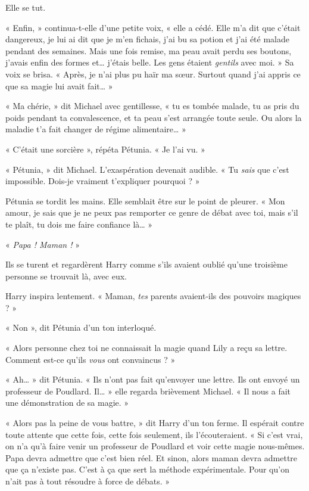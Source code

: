 Elle se tut.

« Enfin, » continua-t-elle d'une petite voix, « elle a cédé. Elle m'a dit que c'était dangereux, je lui ai dit que je m'en fichais, j'ai bu sa potion et j'ai été malade pendant des semaines. Mais une fois remise, ma peau avait perdu ses boutons, j'avais enfin des formes et… j'étais belle. Les gens étaient \emph{gentils}  avec moi. » Sa voix se brisa. « Après, je n'ai plus pu haïr ma sœur. Surtout quand j'ai appris ce que sa magie lui avait fait… »

« Ma chérie, » dit Michael avec gentillesse, « tu es tombée malade, tu as pris du poids pendant ta convalescence, et ta peau s'est arrangée toute seule. Ou alors la maladie t'a fait changer de régime alimentaire… »

« C'était une sorcière », répéta Pétunia. « Je l'ai vu. »

« Pétunia, » dit Michael. L'exaspération devenait audible. « Tu \emph{sais}  que c'est impossible. Dois-je vraiment t'expliquer pourquoi ? »

Pétunia se tordit les mains. Elle semblait être sur le point de pleurer. « Mon amour, je sais que je ne peux pas remporter ce genre de débat avec toi, mais s'il te plaît, tu dois me faire confiance là… »

« \emph{Papa ! Maman !}  »

Ils se turent et regardèrent Harry comme s'ils avaient oublié qu'une troisième personne se trouvait là, avec eux.

Harry inspira lentement. « Maman, \emph{tes}  parents avaient-ils des pouvoirs magiques ? »

« Non », dit Pétunia d'un ton interloqué.

« Alors personne chez toi ne connaissait la magie quand Lily a reçu sa lettre. Comment est-ce qu'ils \emph{vous}  ont convaincus ? »

« Ah… » dit Pétunia. « Ils n'ont pas fait qu'envoyer une lettre. Ils ont envoyé un professeur de Poudlard. Il… » elle regarda brièvement Michael. « Il nous a fait une démonstration de sa magie. »

« Alors pas la peine de vous battre, » dit Harry d'un ton ferme. Il espérait contre toute attente que cette fois, cette fois seulement, ils l'écouteraient. « Si c'est vrai, on n'a qu'à faire venir un professeur de Poudlard et voir cette magie nous-mêmes. Papa devra admettre que c'est bien réel. Et sinon, alors maman devra admettre que ça n'existe pas. C'est à ça que sert la méthode expérimentale. Pour qu'on n'ait pas à tout résoudre à force de débats. »

